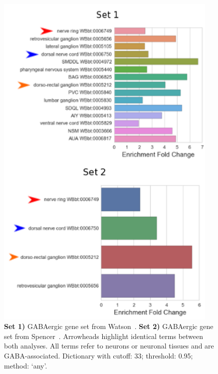 \documentclass{bmcart}
\begin{document}
\begin{backmatter}
\begin{figure}
  \includegraphics[width=0.95\textwidth]{GABAcomparison2.png}
  \captionsetup{width= 0.95\textwidth}
  \caption{
  \textbf{Set 1)} GABAergic gene set from Watson~\cite{Watson2008a}.
  \textbf{Set 2)} GABAergic gene set from Spencer~\cite{Spencer2011}.
  Arrowheads highlight identical terms between both analyses. All terms refer to neurons or neuronal tissues and are GABA-associated. Dictionary with cutoff: 33; threshold: 0.95; method: `any'.
   }
  \label{fig:intragree}
\end{figure}




\end{backmatter}
\end{document}
